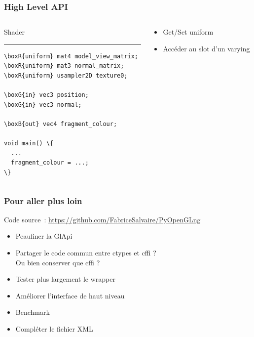 \begin{frame}[fragile]
  \frametitle{High Level API}
  \begin{center}
    \begin{columns}
      \begin{column}{.35\textwidth}
        \begin{center}
          Shader
          \rule{\textwidth}{1pt}
          {\scriptsize
\begin{Verbatim}[commandchars=\\\{\}]
\boxR{uniform} mat4 model_view_matrix;
\boxR{uniform} mat3 normal_matrix;
\boxR{uniform} usampler2D texture0;

\boxG{in} vec3 position;
\boxG{in} vec3 normal;

\boxB{out} vec4 fragment_colour;

void main() \{
  ...
  fragment_colour = ...;
\}
\end{Verbatim}
          }
        \end{center}
      \end{column}
      \begin{column}{.5\textwidth}
        \begin{itemize}
        \item Get/Set uniform \\
        \item Accéder au slot d'un varying \\
        \end{itemize}
      \end{column}
    \end{columns}
  \end{center}
  \note{
    \begin{enumerate}
    \item 
    \end{enumerate}
  }
\end{frame}

\begin{frame}
  \frametitle{Pour aller plus loin}
  Code source~:
  \href{https://github.com/FabriceSalvaire/PyOpenGLng}{https://github.com/FabriceSalvaire/PyOpenGLng} \\[1em]
  \begin{itemize}
  \item Peaufiner la GlApi
  \item Partager le code commun entre ctypes et cffi ? \\
    Ou bien conserver que cffi ?
  \item Tester plus largement le wrapper
  \item Améliorer l'interface de haut niveau
  \item Benchmark
  \item Compléter le fichier XML
  \end{itemize}
  \note{
    \begin{enumerate}
    \item 
    \end{enumerate}
  }
\end{frame}

